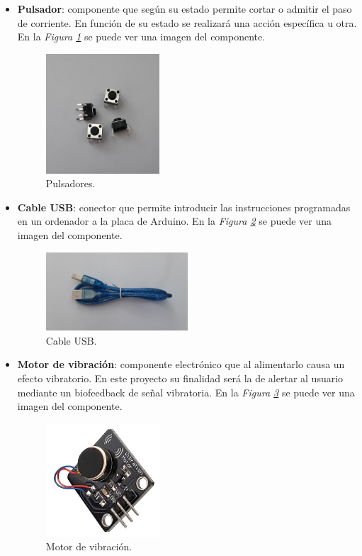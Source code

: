 \begin{itemize}
\item \textbf{Pulsador}: componente que según su estado permite cortar o admitir el paso de corriente. En función de su estado se realizará una acción específica u otra. En la \textit{Figura \ref{fig:pulsador}} se puede ver una imagen del componente.
\begin{figure}[h!]
    \centering
    \includegraphics[width=0.4\textwidth]{img/imgPulsador.JPG}
    \caption{Pulsadores.}
    \label{fig:pulsador} 
\end{figure}

\item \textbf{Cable USB}: conector que permite introducir las instrucciones programadas en un ordenador a la placa de Arduino. En la \textit{Figura \ref{fig:cableUSB}} se puede ver una imagen del componente.
\begin{figure}[h!]
    \centering
    \includegraphics[width=0.5\textwidth]{img/imgCableUSB.JPG}
    \caption{Cable USB.}
    \label{fig:cableUSB} 
\end{figure}

\item \textbf{Motor de vibración}: componente electrónico que al alimentarlo causa un efecto vibratorio. En este proyecto su finalidad será la de alertar al usuario mediante un biofeedback de señal vibratoria. En la \textit{Figura \ref{fig:motorVibr}} se puede ver una imagen del componente.
\begin{figure}[h!]
    \centering
    \includegraphics[width=0.4\textwidth]{img/MotorVibr.jpg}
    \caption{Motor de vibración.\cite{imgMotorVibr}}
    \label{fig:motorVibr} 
\end{figure}


\end{itemize}
